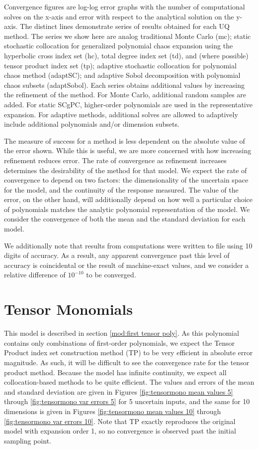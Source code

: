 Convergence figures are
log-log error graphs with the number of computational solves on the x-axis and error with respect to the analytical
solution on the y-axis.  The distinct lines demonstrate series of results obtained for each UQ method.  
The series we show here are analog traditional Monte Carlo (mc); static 
stochastic collocation for generalized polynomial chaos expansion using the hyperbolic
cross index set (hc), total degree index set (td), and (where possible) tensor product index set (tp); adaptive stochastic
collocation for polynomial
chaos method (adaptSC); and adaptive Sobol decomposition with polynomial chaos subsets (adaptSobol).
Each
series obtains additional values by increasing the refinement of the method.  For Monte Carlo, additional
random samples are added.  For static SCgPC, higher-order polynomials are used in the representative expansion.  For
adaptive methods, additional solves are allowed to adaptively include additional polynomials and/or dimension
subsets.

The measure of success for a method is less dependent on the absolute value of the error shown.  While this is
useful, we are more concerned with how increasing refinement reduces error.  The
rate of convergence as refinement increases determines the desirability of the method for that model.  We
expect the rate of convergence to depend on two factors: the dimensionality of the uncertain space for the
model, and the continuity of the response measured.  The value of the error, on the other hand, will additionally
depend on how well a particular choice of polynomials matches the analytic polynomial representation of the model.
We consider the convergence of both the mean and the standard deviation for each model.

We additionally note that results from \raven{} computations were written to file using 10 digits of accuracy.
As a result, any apparent convergence past this level of accuracy is coincidental or the result of
machine-exact values, and we consider a relative difference of $10^{-10}$ to be converged.

\section{Tensor Monomials}
This model is described in section \ref{mod:first tensor poly}.  As this polynomial contains only combinations of
first-order polynomials, we expect the Tensor Product index set construction method (TP) to be very efficient
in absolute error magnitude.  
As such, it will be difficult to see the convergence rate for the tensor product method.
Because the model has infinite continuity, we expect all collocation-based
methods to be quite efficient.  The values and errors of the mean and standard deviation are given in Figures
\ref{fig:tensormono mean values 5} through \ref{fig:tensormono var errors 5} for 5 uncertain inputs, and the same
for 10 dimensions is given in Figures \ref{fig:tensormono mean values 10} through \ref{fig:tensormono var
errors 10}.  Note that TP exactly reproduces the original model with expansion order 1, so no convergence is
observed past the initial sampling point.

